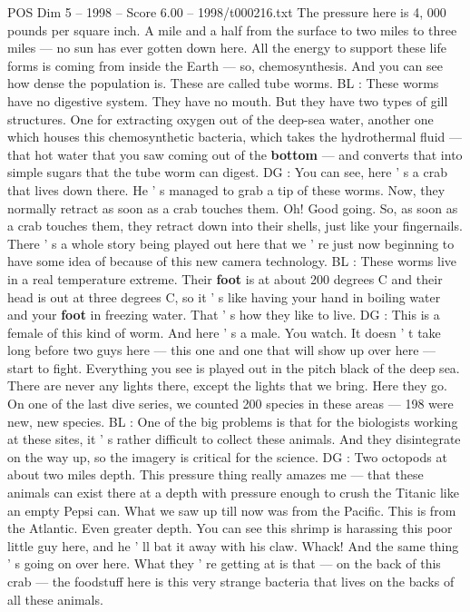 \begin{textsample}{POS Dim 5 – 1998 – Score 6.00 – 1998/t000216.txt}
The pressure here is 4, 000 pounds per square inch.
A mile and a half from the surface to two miles to three miles — no sun has ever gotten down here.
All the energy to support these life forms is coming from inside the Earth — so, chemosynthesis.
And you can see how dense the population is.
These are called tube worms.
BL : These worms have no digestive system.
They have no mouth.
But they have two types of gill structures.
One for extracting oxygen out of the deep-sea water, another one which houses this chemosynthetic bacteria, which takes the hydrothermal fluid — that hot water that you saw coming out of the \textbf{bottom} — and converts that into simple sugars that the tube worm can digest.
DG : You can see, here ' s a crab that lives down there.
He ' s managed to grab a tip of these worms.
Now, they normally retract as soon as a crab touches them.
Oh!
Good going.
So, as soon as a crab touches them, they retract down into their shells, just like your fingernails.
There ' s a whole story being played out here that we ' re just now beginning to have some idea of because of this new camera technology.
BL : These worms live in a real temperature extreme.
Their \textbf{foot} is at about 200 degrees C and their head is out at three degrees C, so it ' s like having your hand in boiling water and your \textbf{foot} in freezing water.
That ' s how they like to live.
DG : This is a female of this kind of worm.
And here ' s a male.
You watch.
It doesn ' t take long before two guys here — this one and one that will show up over here — start to fight.
Everything you see is played out in the pitch black of the deep sea.
There are never any lights there, except the lights that we bring.
Here they go.
On one of the last dive series, we counted 200 species in these areas — 198 were new, new species.
BL : One of the big problems is that for the biologists working at these sites, it ' s rather difficult to collect these animals.
And they disintegrate on the way up, so the imagery is critical for the science.
DG : Two octopods at about two miles depth.
This pressure thing really amazes me — that these animals can exist there at a depth with pressure enough to crush the Titanic like an empty Pepsi can.
What we saw up till now was from the Pacific.
This is from the Atlantic.
Even greater depth.
You can see this shrimp is harassing this poor little guy here, and he ' ll bat it away with his claw.
Whack!
And the same thing ' s going on over here.
What they ' re getting at is that — on the back of this crab — the foodstuff here is this very strange bacteria that lives on the backs of all these animals.

\end{textsample}
